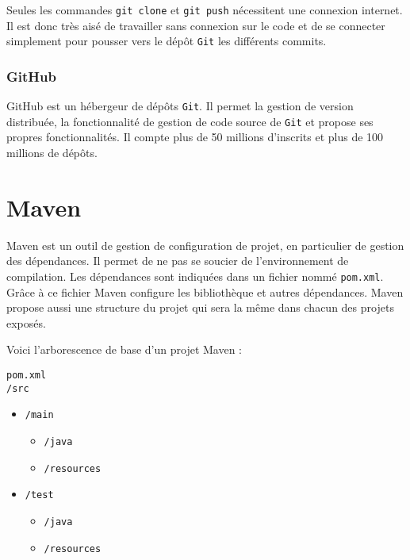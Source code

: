 Seules les commandes \texttt{git clone} et  \texttt{git push} nécessitent une connexion internet. Il est donc très aisé de travailler sans connexion sur le code et de se connecter simplement pour pousser vers le dépôt \texttt{Git} les différents commits.

\subsubsection*{GitHub \href{https://github.com/barnabegeffroy}{\faGithub}}
GitHub est un hébergeur de dépôts \texttt{Git}. Il permet la gestion de version distribuée, la fonctionnalité de gestion de code source de \texttt{Git} et propose ses propres fonctionnalités. Il compte plus de 50 millions d'inscrits et plus de 100 millions de dépôts.

\section*{Maven}
Maven est un outil de gestion de configuration de projet, en particulier de gestion des dépendances. Il permet de ne pas se soucier de l’environnement de compilation. Les dépendances sont indiquées dans un fichier nommé \texttt{pom.xml}. Grâce à ce fichier Maven configure les bibliothèque et autres dépendances. Maven propose aussi une structure du projet qui sera la même dans chacun des projets exposés. 

Voici l'arborescence de base d'un projet Maven :
\begin{center}
    \begin{minipage}[t]{3.5cm}
        \texttt{pom.xml}\\
        \texttt{/src}
        \begin{itemize}
            \item[] \texttt{/main}
                  \begin{itemize}
                      \item[] \texttt{/java}
                  \end{itemize}\vspace{-0.8ex}
                  \begin{itemize}
                      \item[] \texttt{/resources}
                  \end{itemize}\vspace{-0.8ex}
            \item[] \texttt{/test}
                  \begin{itemize}
                      \item[] \texttt{/java}
                  \end{itemize}\vspace{-0.8ex}
                  \begin{itemize}
                      \item[] \texttt{/resources}
                  \end{itemize}\vspace{-0.8ex}
        \end{itemize}
    \end{minipage}\hfill%
\end{center}